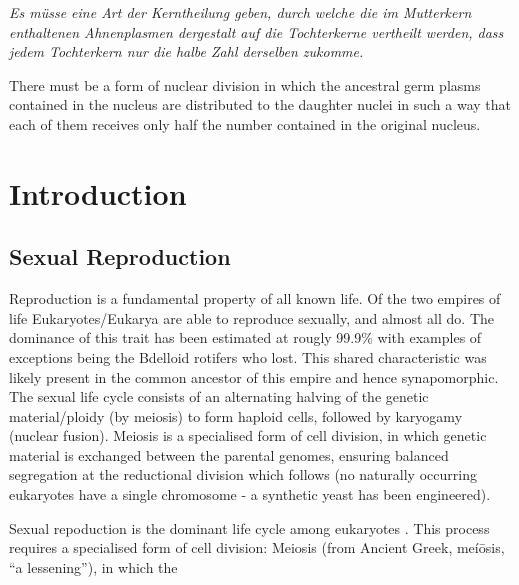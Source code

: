 \begin{savequote}[8cm]
\textit{Es müsse eine Art der Kerntheilung geben, durch welche die im Mutterkern enthaltenen Ahnenplasmen dergestalt auf die Tochterkerne vertheilt werden, dass jedem Tochterkern nur die halbe Zahl derselben zukomme.}

There must be a form of nuclear division in which the ancestral germ plasms contained in the nucleus are distributed to the daughter nuclei in such a way that each of them receives only half the number contained in the original nucleus.
\end{savequote}

\chapter{\label{ch:1-intro}Introduction} 

\minitoc



\section{Sexual Reproduction}
Reproduction is a fundamental property of all known life. Of the two empires of life Eukaryotes/Eukarya are able to reproduce sexually, and almost all do. The dominance of this trait has been estimated at rougly 99.9\% with examples of exceptions being the Bdelloid rotifers who lost. This shared characteristic was likely present in the common ancestor of this empire and hence synapomorphic. The sexual life cycle consists of an alternating halving of the genetic material/ploidy (by meiosis) to form haploid cells, followed by karyogamy (nuclear fusion). Meiosis is a specialised form of cell division, in which genetic material is exchanged between the parental genomes, ensuring balanced segregation at the reductional division which follows (no naturally occurring eukaryotes have a single chromosome - a synthetic yeast has been engineered).

Sexual repoduction is the dominant life cycle among eukaryotes \cite{White1978Modes}. This process requires a specialised form of cell division: Meiosis (from Ancient Greek, meíōsis, “a lessening”), in which the 

